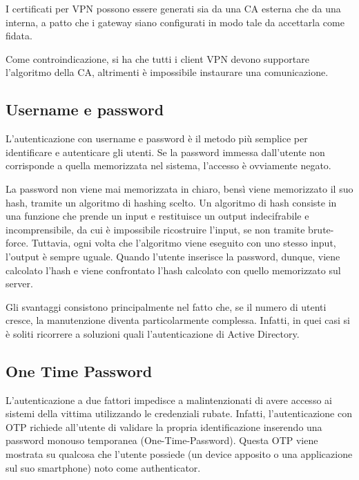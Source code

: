 I certificati per VPN possono essere generati sia da una CA esterna che da una interna, a patto che i gateway siano configurati in modo tale da accettarla come fidata.

Come controindicazione, si ha che tutti i client VPN devono supportare l'algoritmo della CA, altrimenti è impossibile instaurare una comunicazione.


\subsection{Username e password}

L'autenticazione con username e password è il metodo più semplice per identificare e autenticare gli utenti. Se la password immessa dall'utente non corrisponde a quella memorizzata nel sistema, l'accesso è ovviamente negato.

La password non viene mai memorizzata in chiaro, bensì viene memorizzato il suo hash, tramite un algoritmo di hashing scelto. Un algoritmo di hash consiste in una funzione che prende un input e restituisce un output indecifrabile e incomprensibile, da cui è impossibile ricostruire l'input, se non tramite brute-force. Tuttavia, ogni volta che l'algoritmo viene eseguito con uno stesso input, l'output è sempre uguale.
Quando l'utente inserisce la password, dunque, viene calcolato l'hash e viene confrontato l'hash calcolato con quello memorizzato sul server.

Gli svantaggi consistono principalmente nel fatto che, se il numero di utenti cresce, la manutenzione diventa particolarmente complessa. Infatti, in quei casi si è soliti ricorrere a soluzioni quali l'autenticazione di Active Directory.

\subsection{One Time Password}
L'autenticazione a due fattori impedisce a malintenzionati di avere accesso ai sistemi della vittima utilizzando le credenziali rubate. Infatti, l'autenticazione con OTP richiede all'utente di validare la propria identificazione inserendo una password monouso temporanea (One-Time-Password).
Questa OTP viene mostrata su qualcosa che l'utente possiede (un device apposito o una applicazione sul suo smartphone) noto come authenticator.



